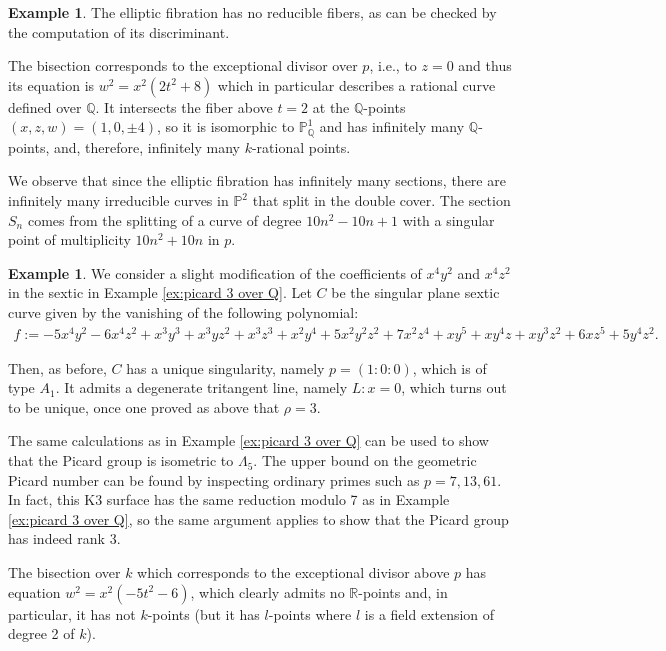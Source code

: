 \documentclass{amsart}
\theoremstyle{definition}
\newtheorem{example}[theorem]{Example}
\numberwithin{equation}{section}
\newcommand{\Q}{\mathbb{Q}}
\begin{document}
\begin{example}
The elliptic fibration has no reducible fibers, as can be checked by the computation of its discriminant.

The bisection corresponds to the exceptional divisor over $p$, i.e., to $z=0$ and thus its equation is  $w^2=x^2(2t^2+8)$ which in particular describes a rational curve defined over $\Q$. It intersects the fiber above $t=2$ at the $\mathbb{Q}$-points $(x,z,w)=(1,0,\pm 4)$, so it is isomorphic to $\mathbb{P}^1_{\mathbb{Q}}$ and has infinitely many $\mathbb{Q}$-points, and, therefore, infinitely many $k$-rational points.   

We observe that since the elliptic fibration has infinitely many sections, there are infinitely many irreducible curves in $\mathbb{P}^2$ that split in the double cover. The section $S_n$ comes from the splitting of a curve of degree $10n^2-10n+1$ with a singular point of multiplicity $10n^2+10n$ in $p$.
\end{example}

\begin{example}\label{ex:picard3overquadratic}
We consider a slight modification of the coefficients of $x^4y^2$ and $x^4z^2$ in the sextic in Example \ref{ex:picard 3 over Q}. Let $C$ be the singular plane sextic curve given by the vanishing of the following polynomial:
\begin{align*}
f:=-5x^4y^2  -6x^4z^2 + x^3y^3 + x^3yz^2 + x^3z^3  + x^2y^4 + 5x^2y^2z^2 + 7x^2z^4 + xy^5+xy^4z +xy^3z^2 + 6xz^5 + 5y^4z^2.
\end{align*}


Then, as before, $C$ has a unique singularity, namely $p=(1:0:0)$, which is of type $A_1$. It admits a degenerate tritangent line, namely $L: x=0$, which turns out to be unique, once one proved as above that $\rho=3$. 

The same calculations as in Example \ref{ex:picard 3 over Q} can be used to show that the Picard group is isometric to $\Lambda_5$. The upper bound on the geometric Picard number can be found by inspecting ordinary primes such as $p=7,13,61$. In fact, this K3 surface has the same reduction modulo 7 as in Example \ref{ex:picard 3 over Q}, so the same argument applies to show that the Picard group has indeed rank 3. 

The bisection over $k$ which corresponds to the exceptional divisor above $p$ has equation $w^2=x^2(-5t^2-6)$, which clearly admits no $\mathbb{R}$-points and, in particular, it has not $k$-points (but it has $l$-points where $l$ is a field extension of degree 2 of $k$).
\end{example}
\end{document}
